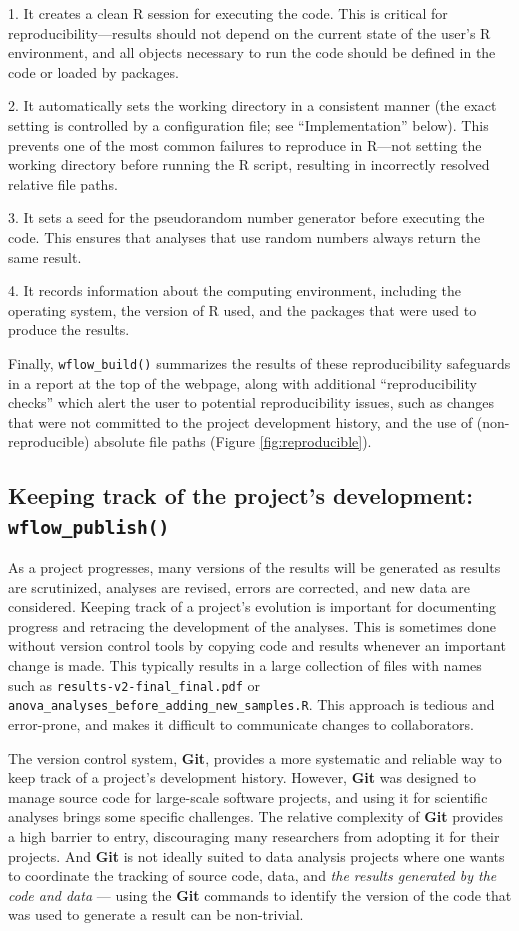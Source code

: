 \documentclass[9pt,a4paper]{extarticle}
\begin{document}
1. It creates a clean R session for executing the code. This is critical
for reproducibility—results should not depend on the current state of
the user's R environment, and all objects necessary to run the code
should be defined in the code or loaded by packages.

2. It automatically sets the working directory in a consistent manner
(the exact setting is controlled by a configuration file; see
``Implementation'' below). This prevents one of the most common failures
to reproduce in R—not setting the working directory before running the R
script, resulting in incorrectly resolved relative file paths.

3. It sets a seed for the pseudorandom number generator before executing
the code. This ensures that analyses that use random numbers always
return the same result.

4. It records information about the computing environment, including the
operating system, the version of R used, and the packages that were used
to produce the results.

Finally, \texttt{wflow\_build()} summarizes the results of these reproducibility
safeguards in a report at the top of the webpage, along with additional
``reproducibility checks'' which alert the user to potential
reproducibility issues, such as changes that were not committed to the
project development history, and the use of (non-reproducible) absolute
file paths (Figure \ref{fig:reproducible}).

\subsection*{Keeping track of the project's development: \texttt{wflow\_publish()}}

As a project progresses, many versions of the results will be generated
as results are scrutinized, analyses are revised, errors are corrected,
and new data are considered. Keeping track of a project's evolution is
important for documenting progress and retracing the development of the
analyses. This is sometimes done without version control tools by
copying code and results whenever an important change is made. This
typically results in a large collection of files with names such as
\texttt{results-v2-final\_final.pdf} or
\texttt{anova\_analyses\_before\_adding\_new\_samples.R}. This approach
is tedious and error-prone, and makes it difficult to communicate
changes to collaborators.

The version control system, \textbf{Git}, provides a more systematic and reliable
way to keep track of a project's development history. However, \textbf{Git} was
designed to manage source code for large-scale software projects, and
using it for scientific analyses brings some specific challenges. The
relative complexity of \textbf{Git} provides a high barrier to entry,
discouraging many researchers from adopting it for their projects. And
 \textbf{Git} is not ideally suited to data analysis projects where one wants to
coordinate the tracking of source code, data, and \textit{the results
generated by the code and data} --- using the \textbf{Git} commands to identify
the version of the code that was used to generate a result can be
non-trivial.
\end{document}

